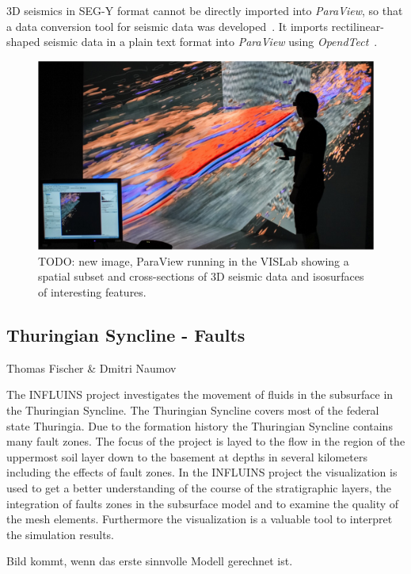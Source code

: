 \documentclass[twocolumn]{svjour3}          %
\begin{document}
3D seismics in SEG-Y format cannot be directly imported into \emph{ParaView}, so that a data conversion tool for seismic data was developed~\cite{bilke:simpleseismicreader}. It imports rectilinear-shaped seismic data in a plain text format into \emph{ParaView} using \emph{OpendTect}~\cite{web:opendtect}.

\begin{figure}
  \includegraphics[width=\linewidth]{images/seismic.jpg}
\caption{TODO: new image, ParaView running in the VISLab showing a spatial subset and cross-sections of 3D seismic data and isosurfaces of interesting features.}
\label{fig:seismic}
\end{figure}

\subsection{Thuringian Syncline - Faults}
\label{thuringian-syncline---faults}
Thomas Fischer \& Dmitri Naumov

The INFLUINS project investigates the movement of fluids in the subsurface in
the Thuringian Syncline. The Thuringian Syncline covers most of the federal
state Thuringia. Due to the formation history the Thuringian Syncline contains
many fault zones. The focus of the project is layed to the flow in the region
of the uppermost soil layer down to the basement at depths in several
kilometers including the effects of fault zones. In the INFLUINS project the
visualization is used to get a better understanding of the course of the
stratigraphic layers, the integration of faults zones in the subsurface model
and to examine the quality of the mesh elements. Furthermore the visualization
is a valuable tool to interpret the simulation results.

Bild kommt, wenn das erste sinnvolle Modell gerechnet ist.
\end{document}

